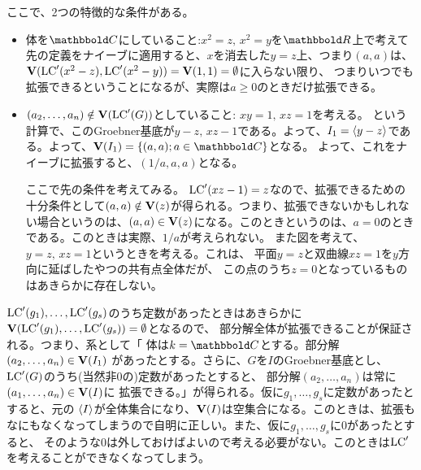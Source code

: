 \documentclass[9pt]{ltjsarticle}
\begin{document}
ここで、2つの特徴的な条件がある。
\begin{itemize}
  \item 体を$\C$にしていること:$x^2 = z,\, x^2 = y$を$\R$上で考えて先の定義をナイーブに適用すると、$x$を消去した$y=z$上、つまり$(a,a)$は、
  $\textbf V({\rm LC}'(x^2-z),{\rm LC}'(x^2-y))=\textbf V(1,1)=\emptyset$に入らない限り、
  つまりいつでも拡張できるということになるが、実際は$a\ge0 $のときだけ拡張できる。
  \item $(a_2,\dots,a_n) \notin \textbf V({\rm LC}'(G))$としていること:
  $xy=1,\, xz=1$を考える。
  という計算で、このGroebner基底が$y-z,\, xz-1$である。よって、$I_1 = \left\langle y-z \right\rangle$である。よって、$\var(I_1) = \set{(a,a); a\in \C}$となる。
  よって、これをナイーブに拡張すると、$(1/a,a,a)$となる。

  ここで先の条件を考えてみる。
  ${\rm LC}'(xz-1)=z$なので、拡張できるための十分条件として$(a,a) \notin \textbf V(z)$が得られる。つまり、拡張できないかもしれない場合というのは、$(a,a) \in \textbf V(z)$になる。このときというのは、$a=0$のときである。このときは実際、$1/a$が考えられない。
  また図を考えて、$y=z,\, xz=1$というときを考える。これは、
  平面$y=z$と双曲線$xz=1$を$y$方向に延ばしたやつの共有点全体だが、
  この点のうち$z=0$となっているものはあきらかに存在しない。

\end{itemize}

${\rm LC}'(g_1),\dots,{\rm LC}'(g_s)$のうち定数があったときはあきらかに$\textbf V({\rm LC}'(g_1),\dots,{\rm LC}'(g_s)) = \emptyset$となるので、
部分解全体が拡張できることが保証される。つまり、系として「
体は$k=\C$とする。部分解$(a_2,\dots,a_n)\in \textbf V(I_1)$
があったとする。さらに、$G$を$I$のGroebner基底とし、
${\rm LC}'(G)$のうち(当然非0の)定数があったとすると、
部分解$(a_2,\dots,a_n)$は常に$(a_1,\dots,a_n) \in \textbf V(I)$に
拡張できる。」が得られる。仮に$g_1,\dots,g_s$に定数があったとすると、元の
$\left\langle I \right\rangle$が全体集合になり、$\textbf V(I)$は空集合になる。このときは、拡張もなにもなくなってしまうので自明に正しい。また、仮に$g_1,\dots,g_s$に0があったとすると、
そのような0は外しておけばよいので考える必要がない。このときは${\rm LC}'$を考えることができなくなってしまう。
\end{document}

